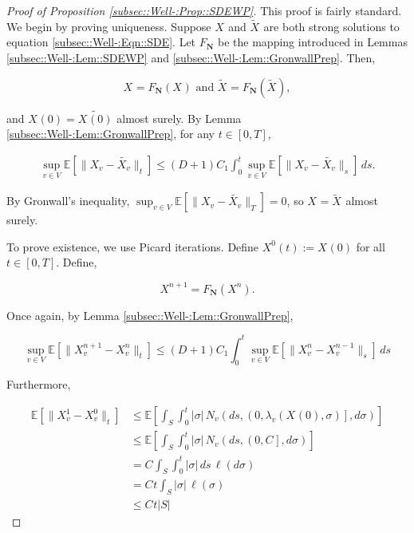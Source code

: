 \documentclass[12pt]{article}
\newcommand{\skipLine}{\vspace{12pt}}
\newcommand{\mb}{\mathbb}
\newcommand{\te}{\text}
\newcommand{\ex}[1]{\mb{E}\left[#1\right]}			%
\newcommand{\defeq}{:=}								%
\renewcommand{\v}{v}							%
\renewcommand{\S}{S}							%
\newcommand{\s}{\sigma}							%
\newcommand{\T}{T}								%
\renewcommand{\t}{t}							%
\newcommand{\degr}{D}								%
\newcommand{\poiss}[1]{N_{#1}}						%
\newcommand{\poisses}{\mathbf{N}}				%
\newcommand{\V}{V}									%
\renewcommand{\tt}{s}								%
\newcommand{\numb}{n}								%
\newcommand{\rxvt}[2]{X_{#1}{(#2)}}					%
\newcommand{\rxvtn}[3]{X_{#1}^{#3}(#2)}				%
\newcommand{\rxvts}[2]{X_{#1}{#2}}					%
\newcommand{\rxvtsn}[3]{X_{#1}^{#3}{#2}}			%
\newcommand{\rate}[1]{\lambda_{#1}}					%
\newcommand{\const}[1]{C_{#1}}						%
\newcommand{\Sm}{\ell}								%
\newcommand{\alt}{\widetilde}						%
\begin{document}
\begin{proof}[Proof of Proposition \ref{subsec::Well-:Prop::SDEWP}]

This proof is fairly standard. We begin by proving uniqueness. Suppose \(\rxvts{}{}\) and \(\alt{\rxvts{}{}}\) are both strong solutions to equation \ref{subsec::Well-:Eqn::SDE}. Let \(F_\poisses\) be the mapping introduced in Lemmas \ref{subsec::Well-:Lem::SDEWP} and \ref{subsec::Well-:Lem::GronwallPrep}. Then,

\[\rxvts{}{} = F_\poisses(\rxvts{}{})\te{ and } \alt{\rxvts{}{}} = F_\poisses(\alt{\rxvts{}{}}),\]

and \(\rxvt{}{0} = \alt{\rxvt{}{0}}\) almost surely. By Lemma \ref{subsec::Well-:Lem::GronwallPrep}, for any \(\t\in [0,\T]\),

\begin{align*}
\sup_{\v\in \V}\ex{\|\rxvts{\v}{} - \alt{\rxvts{\v}{}}\|_\t} \leq (\degr+1)\const{1}\int_0^\t\sup_{\v\in \V} \ex{\|\rxvts{\v}{} - \alt{\rxvts{\v}{}}\|_\tt}\,d\tt.
\end{align*}

By Gronwall's inequality, \(\sup_{\v \in \V} \ex{\|\rxvts{\v}{} - \alt{\rxvts{\v}{}}\|_\T} = 0\), so \(\rxvts{}{} = \alt{\rxvts{}{}}\) almost surely.

\skipLine

To prove existence, we use Picard iterations. Define \(\rxvtn{}{\t}{0} \defeq \rxvt{}{0}\) for all \(\t \in [0,\T]\). Define,

\[\rxvtsn{}{}{\numb+1} = F_\poisses(\rxvtsn{}{}{\numb}).\]

Once again, by Lemma \ref{subsec::Well-:Lem::GronwallPrep},

\[\sup_{\v \in \V} \ex{\|\rxvtsn{\v}{}{\numb+1} - \rxvtsn{\v}{}{\numb}\|_\t} \leq (\degr+1)\const{1} \int_0^\t \sup_{\v \in \V} \ex{\|\rxvtsn{\v}{}{\numb} - \rxvtsn{\v}{}{\numb-1}\|_\tt}\,d\tt\] 

Furthermore, 

\begin{align*}
\ex{\|\rxvtsn{\v}{}{1} - \rxvtsn{\v}{}{0}\|_\t} &\leq \ex{\int_\S\int_0^\t |\s|\,\poiss{\v}\left(d\tt,\left(0,\rate{\v}(\rxvt{}{0},\s)\right],d\s\right)}\\
&\leq \ex{\int_\S\int_0^\t |\s|\,\poiss{\v}\left(d\tt,\left(0,\const{}\right],d\s\right)}\\
&= \const{}\int_\S\int_0^\t |\s|\,d\tt\,\Sm(d\s)\\
&=\const{}\t\int_\S |\s|\,\Sm(\s)\\
&\leq \const{}\t|\S|
\end{align*}


\end{proof}
\end{document}

